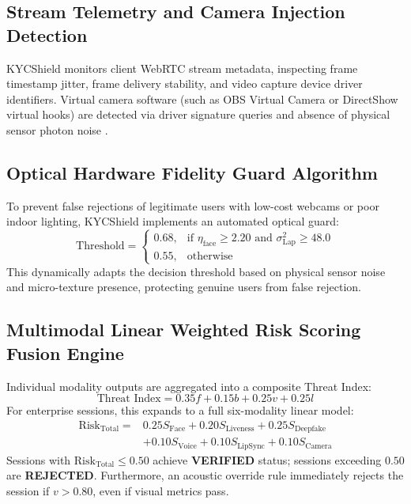 \documentclass[conference]{IEEEtran}
\begin{document}
\subsection{Stream Telemetry and Camera Injection Detection}
KYCShield monitors client WebRTC stream metadata, inspecting frame timestamp jitter, frame delivery stability, and video capture device driver identifiers. Virtual camera software (such as OBS Virtual Camera or DirectShow virtual hooks) are detected via driver signature queries and absence of physical sensor photon noise \cite{iso30107}.

\subsection{Optical Hardware Fidelity Guard Algorithm}
To prevent false rejections of legitimate users with low-cost webcams or poor indoor lighting, KYCShield implements an automated optical guard:
\begin{equation}
\text{Threshold} = \begin{cases} 0.68, & \text{if } \eta_{\text{face}} \ge 2.20 \text{ and } \sigma^2_{\text{Lap}} \ge 48.0 \\ 0.55, & \text{otherwise} \end{cases}
\end{equation}
This dynamically adapts the decision threshold based on physical sensor noise and micro-texture presence, protecting genuine users from false rejection.

\subsection{Multimodal Linear Weighted Risk Scoring Fusion Engine}
Individual modality outputs are aggregated into a composite Threat Index:
\begin{equation}
\text{Threat Index} = 0.35 f + 0.15 b + 0.25 v + 0.25 l
\end{equation}
For enterprise sessions, this expands to a full six-modality linear model:
\begin{equation}
\begin{aligned}
\text{Risk}_{\text{Total}} = & 0.25 S_{\text{Face}} + 0.20 S_{\text{Liveness}} + 0.25 S_{\text{Deepfake}} \\
& + 0.10 S_{\text{Voice}} + 0.10 S_{\text{LipSync}} + 0.10 S_{\text{Camera}}
\end{aligned}
\end{equation}
Sessions with $\text{Risk}_{\text{Total}} \le 0.50$ achieve \textbf{VERIFIED} status; sessions exceeding $0.50$ are \textbf{REJECTED}. Furthermore, an acoustic override rule immediately rejects the session if $v > 0.80$, even if visual metrics pass.
\end{document}

